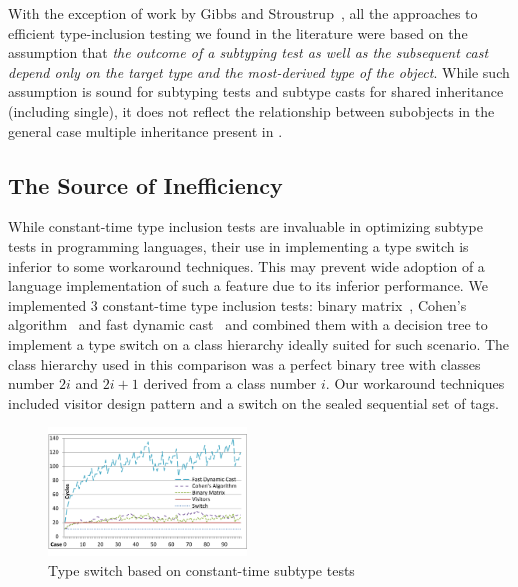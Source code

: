 With the exception of work by Gibbs and Stroustrup~\cite{FastDynCast}, all the 
approaches to efficient type-inclusion testing we found in the literature were 
based on the assumption that \emph{the outcome of a subtyping test as well as 
the subsequent cast depend only on the target type and the most-derived type of 
the object}. While such assumption is sound for subtyping tests and subtype 
casts for shared inheritance (including single), it does not reflect the 
relationship between subobjects in the general case multiple inheritance present 
in \Cpp{}.

\subsection{The Source of Inefficiency}

While constant-time type inclusion tests are invaluable in optimizing subtype 
tests in programming languages, their use in implementing a type switch is 
inferior to some workaround techniques. This may prevent wide adoption of a 
language implementation of such a feature due to its inferior performance. 
We implemented 3 constant-time type inclusion tests: binary 
matrix~\cite{Vitek97}, Cohen's algorithm~\cite{Cohen91} and fast dynamic 
cast~\cite{FastDynCast} and combined them with a decision tree to implement a 
type switch on a class hierarchy ideally suited for such scenario.  
The class hierarchy used in this comparison was a perfect binary tree with 
classes number $2i$ and $2i+1$ derived from a class number $i$. Our workaround 
techniques included visitor design pattern and a switch on the sealed sequential 
set of tags.

\begin{figure}[htbp]
  \centering
    \includegraphics[width=0.47\textwidth]{DCast-vs-Visitors.pdf}
  \caption{Type switch based on constant-time subtype tests}
  \label{fig:DCastVis2}
\end{figure}

